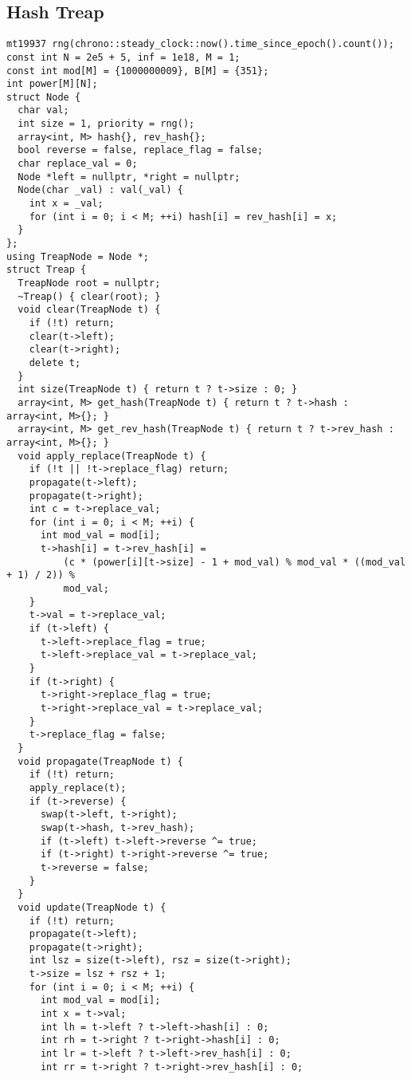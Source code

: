 \documentclass[twoside]{article}
\begin{document}
\begin{multicols*}{2}
{\subsection*{Hash Treap}
}
\begin{verbatim}
mt19937 rng(chrono::steady_clock::now().time_since_epoch().count());
const int N = 2e5 + 5, inf = 1e18, M = 1;
const int mod[M] = {1000000009}, B[M] = {351};
int power[M][N];
struct Node {
  char val;
  int size = 1, priority = rng();
  array<int, M> hash{}, rev_hash{};
  bool reverse = false, replace_flag = false;
  char replace_val = 0;
  Node *left = nullptr, *right = nullptr;
  Node(char _val) : val(_val) {
    int x = _val;
    for (int i = 0; i < M; ++i) hash[i] = rev_hash[i] = x;
  }
};
using TreapNode = Node *;
struct Treap {
  TreapNode root = nullptr;
  ~Treap() { clear(root); }
  void clear(TreapNode t) {
    if (!t) return;
    clear(t->left);
    clear(t->right);
    delete t;
  }
  int size(TreapNode t) { return t ? t->size : 0; }
  array<int, M> get_hash(TreapNode t) { return t ? t->hash : array<int, M>{}; }
  array<int, M> get_rev_hash(TreapNode t) { return t ? t->rev_hash : array<int, M>{}; }
  void apply_replace(TreapNode t) {
    if (!t || !t->replace_flag) return;
    propagate(t->left);
    propagate(t->right);
    int c = t->replace_val;
    for (int i = 0; i < M; ++i) {
      int mod_val = mod[i];
      t->hash[i] = t->rev_hash[i] =
          (c * (power[i][t->size] - 1 + mod_val) % mod_val * ((mod_val + 1) / 2)) %
          mod_val;
    }
    t->val = t->replace_val;
    if (t->left) {
      t->left->replace_flag = true;
      t->left->replace_val = t->replace_val;
    }
    if (t->right) {
      t->right->replace_flag = true;
      t->right->replace_val = t->replace_val;
    }
    t->replace_flag = false;
  }
  void propagate(TreapNode t) {
    if (!t) return;
    apply_replace(t);
    if (t->reverse) {
      swap(t->left, t->right);
      swap(t->hash, t->rev_hash);
      if (t->left) t->left->reverse ^= true;
      if (t->right) t->right->reverse ^= true;
      t->reverse = false;
    }
  }
  void update(TreapNode t) {
    if (!t) return;
    propagate(t->left);
    propagate(t->right);
    int lsz = size(t->left), rsz = size(t->right);
    t->size = lsz + rsz + 1;
    for (int i = 0; i < M; ++i) {
      int mod_val = mod[i];
      int x = t->val;
      int lh = t->left ? t->left->hash[i] : 0;
      int rh = t->right ? t->right->hash[i] : 0;
      int lr = t->left ? t->left->rev_hash[i] : 0;
      int rr = t->right ? t->right->rev_hash[i] : 0;

\end{verbatim}
\end{multicols*}
\end{document}
